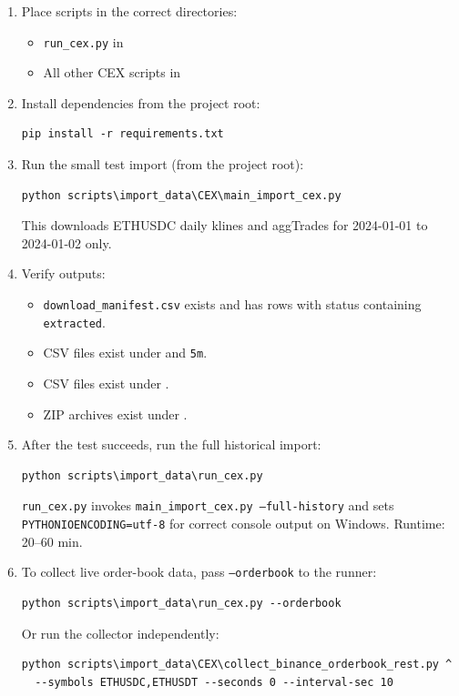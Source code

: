 \documentclass[11pt,a4paper]{article}
\begin{document}
\begin{enumerate}
  \item Place scripts in the correct directories:
        \begin{itemize}
          \item \texttt{run\_cex.py} in
          \item All other CEX scripts in
        \end{itemize}

  \item Install dependencies from the project root:
\begin{lstlisting}
pip install -r requirements.txt
\end{lstlisting}

  \item Run the small test import (from the project root):
\begin{lstlisting}
python scripts\import_data\CEX\main_import_cex.py
\end{lstlisting}
  This downloads ETHUSDC daily klines and aggTrades for
  2024-01-01 to 2024-01-02 only.

  \item Verify outputs:
        \begin{itemize}
          \item \texttt{download\_manifest.csv} exists and has rows
                with status containing \texttt{extracted}.
          \item CSV files exist under
                and \texttt{5m}.
          \item CSV files exist under
                .
          \item ZIP archives exist under
                .
        \end{itemize}

  \item After the test succeeds, run the full historical import:
\begin{lstlisting}
python scripts\import_data\run_cex.py
\end{lstlisting}
  \texttt{run\_cex.py} invokes \texttt{main\_import\_cex.py
  --full-history} and sets \texttt{PYTHONIOENCODING=utf-8}
  for correct console output on Windows. Runtime: 20--60 min.

  \item To collect live order-book data, pass \texttt{--orderbook}
        to the runner:
\begin{lstlisting}
python scripts\import_data\run_cex.py --orderbook
\end{lstlisting}
  Or run the collector independently:
\begin{lstlisting}
python scripts\import_data\CEX\collect_binance_orderbook_rest.py ^
  --symbols ETHUSDC,ETHUSDT --seconds 0 --interval-sec 10
\end{lstlisting}
\end{enumerate}
\end{document}
